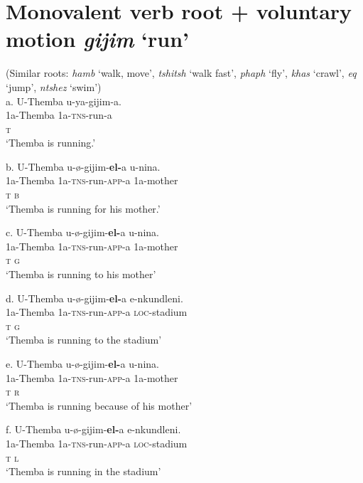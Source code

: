 \documentclass[output=paper]{langsci/langscibook}
\begin{document}
\chapter[Monovalent verb root + voluntary motion gijim ‘run’]{Monovalent verb root + voluntary motion \textit{gijim }‘run’}
     (Similar roots: \textit{hamb} ‘walk, move’, \textit{tshitsh} ‘walk fast’, \textit{phaph} ‘fly’, \textit{khas} ‘crawl’, \textit{eq} ‘jump’, \textit{ntshez} ‘swim’)\\
\gll   a.  U-Themba   u-ya-gijim-a.\\
         1a-Themba     1a-\textsc{tns}{}-run-a \\
         \textsc{t}\\
\glt     ‘Themba is running.’
\z

\gll   b.  U-Themba   u-ø-gijim-\textbf{el-}a      u-nina. \\
         1a-Themba     1a-\textsc{tns}{}-run-\textsc{app}{}-a    1a-mother\\
         \textsc{t                    b}\\
\glt     ‘Themba is running for his mother.’   
\z

\gll   c.  U-Themba    u-ø-gijim-\textbf{el-}a      u-nina. \\
         1a-Themba  1a-\textsc{tns}{}-run-\textsc{app}{}-a    1a-mother\\
         \textsc{t                    g}\\
\glt     ‘Themba is running to his mother’
\z

\gll   d.  U-Themba    u-ø-gijim-\textbf{el-}a      e-nkundleni. \\
         1a-Themba  1a-\textsc{tns}{}-run-\textsc{app}{}-a    \textsc{loc}{}-stadium\\
         \textsc{t                    g}\\
\glt     ‘Themba is running to the stadium’
\z

\gll   e.  U-Themba   u-ø-gijim-\textbf{el-}a      u-nina. \\
         1a-Themba     1a-\textsc{tns}{}-run-\textsc{app}{}-a    1a-mother\\
         \textsc{t                    r}\\
\glt     ‘Themba is running because of his mother’
\z

\gll   f.  U-Themba   u-ø-gijim-\textbf{el-}a    e-nkundleni. \\
         1a-Themba     1a-\textsc{tns}{}-run-\textsc{app}{}-a  \textsc{loc}{}-stadium\\
         \textsc{t                  l}\\
\glt     ‘Themba is running in the stadium’
\z
\end{document}
